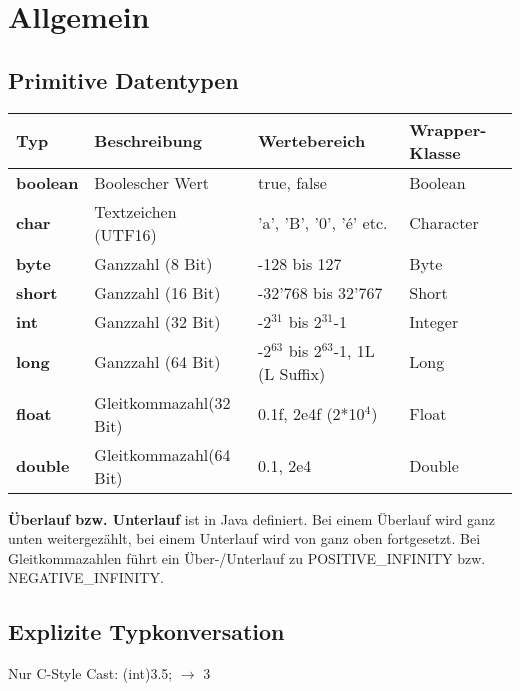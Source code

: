 \vspace{-0.5cm}
\section*{Allgemein}
	\begin{minipage}[t]{12.5cm}
		\subsection*{Primitive Datentypen}
			\begin{tabular}{|>{\bfseries}l l l l|}
				\hline Typ & \bfseries{Beschreibung} & \bfseries{Wertebereich} & \bfseries{Wrapper-Klasse}
				\\\hline   boolean & Boolescher Wert & true, false & Boolean
				\\ char & Textzeichen (UTF16) & 'a', 'B', '0', 'é' etc. & Character
				\\ byte & Ganzzahl (8 Bit) & -128 bis 127 & Byte
				\\ short & Ganzzahl (16 Bit) & -32'768 bis 32'767 & Short
				\\ int & Ganzzahl (32 Bit) & -2$^{31}$ bis 2$^{31}$-1 & Integer
				\\ long & Ganzzahl (64 Bit) & -2$^{63}$ bis 2$^{63}$-1, 1L (L Suffix) & Long
				\\ float & Gleitkommazahl(32 Bit) & 0.1f, 2e4f (2*10$^4$) & Float
				\\ double & Gleitkommazahl(64 Bit) & 0.1, 2e4 & Double
				\\\hline
			\end{tabular}
		\end{minipage}
		\hspace*{0.6cm}
		\begin{minipage}[t]{5.7cm}
			\vspace*{0.7cm}
			\textbf{Überlauf bzw. Unterlauf} ist in Java definiert. Bei einem Überlauf wird ganz unten weitergezählt, bei einem Unterlauf wird von ganz oben fortgesetzt. Bei Gleitkommazahlen führt ein Über-/Unterlauf zu POSITIVE\_INFINITY bzw. NEGATIVE\_INFINITY.
			\subsection*{Explizite Typkonversation}
			Nur C-Style Cast: (int)3.5; $\rightarrow$ 3
		\end{minipage}